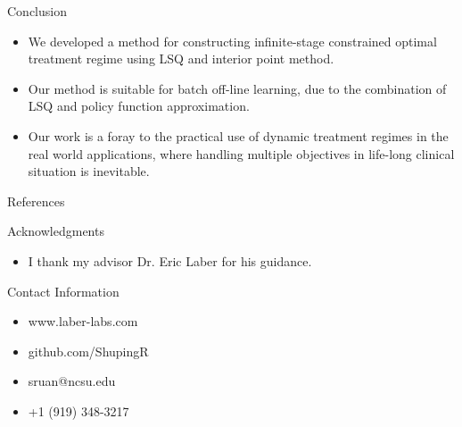 \documentclass[final,hyperref={pdfpagelabels=false}]{beamer}
\begin{document}
\begin{frame}[t]
\begin{columns}[t]
\begin{column}{.465\textwidth}
\begin{block}{Conclusion}
\begin{itemize}
\item We developed a method for constructing infinite-stage constrained optimal treatment regime using LSQ and interior point method.
\item Our method is suitable for batch off-line learning, due to the combination of LSQ and policy function approximation.
\item Our work is a foray to the practical use of dynamic treatment regimes in the real world applications, where handling multiple objectives in life-long clinical situation is inevitable.
\end{itemize}
\end{block}


\begin{block}{References}
\nocite{*} %
\small{
	
	
}
\end{block}


\begin{block}{Acknowledgments}

\begin{itemize}
\item I thank my advisor Dr. Eric Laber for his guidance.
\end{itemize}

\end{block}



\begin{block}{Contact Information}

\begin{itemize}
\item www.laber-labs.com
\item github.com/ShupingR
\item sruan@ncsu.edu
\item +1 (919) 348-3217
\end{itemize}


\end{block}
\end{column}
\end{columns}
\end{frame}
\end{document}
